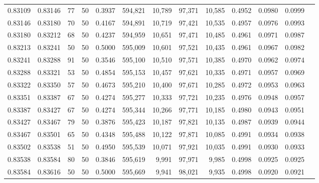 \begin{tabular}{rrrrrrrrrrrrr}
0.83109 & 0.83146 &    77 &  50 &                                     0.3937 & 594,821 &  10,789 &  97,371 &  10,585 & 0.4952 & 0.0980 & 0.0999 \\
0.83146 & 0.83180 &    70 &  50 &                                     0.4167 & 594,891 &  10,719 &  97,421 &  10,535 & 0.4957 & 0.0976 & 0.0993 \\
0.83180 & 0.83212 &    68 &  50 &                                     0.4237 & 594,959 &  10,651 &  97,471 &  10,485 & 0.4961 & 0.0971 & 0.0987 \\
0.83213 & 0.83241 &    50 &  50 &                                     0.5000 & 595,009 &  10,601 &  97,521 &  10,435 & 0.4961 & 0.0967 & 0.0982 \\
0.83241 & 0.83288 &    91 &  50 &                                     0.3546 & 595,100 &  10,510 &  97,571 &  10,385 & 0.4970 & 0.0962 & 0.0974 \\
0.83288 & 0.83321 &    53 &  50 &                                     0.4854 & 595,153 &  10,457 &  97,621 &  10,335 & 0.4971 & 0.0957 & 0.0969 \\
0.83322 & 0.83350 &    57 &  50 &                                     0.4673 & 595,210 &  10,400 &  97,671 &  10,285 & 0.4972 & 0.0953 & 0.0963 \\
0.83351 & 0.83387 &    67 &  50 &                                     0.4274 & 595,277 &  10,333 &  97,721 &  10,235 & 0.4976 & 0.0948 & 0.0957 \\
0.83387 & 0.83427 &    67 &  50 &                                     0.4274 & 595,344 &  10,266 &  97,771 &  10,185 & 0.4980 & 0.0943 & 0.0951 \\
0.83427 & 0.83467 &    79 &  50 &                                     0.3876 & 595,423 &  10,187 &  97,821 &  10,135 & 0.4987 & 0.0939 & 0.0944 \\
0.83467 & 0.83501 &    65 &  50 &                                     0.4348 & 595,488 &  10,122 &  97,871 &  10,085 & 0.4991 & 0.0934 & 0.0938 \\
0.83502 & 0.83538 &    51 &  50 &                                     0.4950 & 595,539 &  10,071 &  97,921 &  10,035 & 0.4991 & 0.0930 & 0.0933 \\
0.83538 & 0.83584 &    80 &  50 &                                     0.3846 & 595,619 &   9,991 &  97,971 &   9,985 & 0.4998 & 0.0925 & 0.0925 \\
0.83584 & 0.83616 &    50 &  50 &                                     0.5000 & 595,669 &   9,941 &  98,021 &   9,935 & 0.4998 & 0.0920 & 0.0921 \\

\end{tabular}
